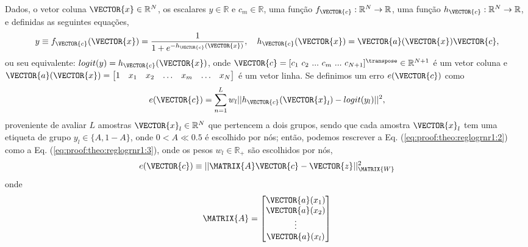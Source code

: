 
\begin{myproofT}\label{proof:theo:reglogrnr1}
Dados,
o vetor coluna $\VECTOR{x} \in \mathbb{R}^{N}$, os escalares $y \in \mathbb{R}$ e $c_m \in \mathbb{R}$,
uma função $f_{\VECTOR{c}}:\mathbb{R}^{N} \rightarrow \mathbb{R}$, 
uma função $h_{\VECTOR{c}}:\mathbb{R}^{N} \rightarrow \mathbb{R}$,  e 
definidas as seguintes equações,
\begin{equation}\label{eq:proof:theo:reglogrnr1:1}
y\equiv f_{\VECTOR{c}}(\VECTOR{x})= \frac{1}{1+e^{-h_{\VECTOR{c}}(\VECTOR{x}) }},
\quad h_{\VECTOR{c}}(\VECTOR{x}) =  \VECTOR{a}(\VECTOR{x})\VECTOR{c},
\end{equation}
ou seu equivalente: $logit(y)=h_{\VECTOR{c}}(\VECTOR{x})$,
onde $\VECTOR{c}=[c_1~ c_2~ ...~ c_m~ ...~ c_{N+1}]^{\transpose} \in \mathbb{R}^{N+1}$ é um vetor coluna e
$\VECTOR{a}(\VECTOR{x})=\begin{bmatrix} 
1& x_1& x_2& \hdots & x_m& \hdots& x_N
\end{bmatrix}$ é um vetor linha.
Se definimos um erro $e(\VECTOR{c})$ como
\begin{equation}\label{eq:proof:theo:reglogrnr1:2}
e(\VECTOR{c}) =  \sum_{n=1}^{L} w_l||h_{\VECTOR{c}}(\VECTOR{x}_l)-logit(y_l)||^2,
\end{equation}
proveniente de avaliar $L$ amostras $\VECTOR{x}_l \in \mathbb{R}^{N}$ que pertencem a dois grupos, 
sendo que cada amostra $\VECTOR{x}_l$ tem uma etiqueta de grupo $y_l\in \{A,1-A\}$, 
onde $0<A\ll 0.5$ é escolhido por nós;
então, podemos rescrever a Eq. (\ref{eq:proof:theo:reglogrnr1:2}) como a Eq. (\ref{eq:proof:theo:reglogrnr1:3}),
onde os pesos $w_l \in \mathbb{R}_+$ são escolhidos por nós,
\begin{equation}\label{eq:proof:theo:reglogrnr1:3}
e(\VECTOR{c}) \equiv ||\MATRIX{A}\VECTOR{c}-\VECTOR{z}||_{\MATRIX{W}}^2 
\end{equation}
onde 
\begin{equation}\label{eq:proof:reglogrnr1:4}
\MATRIX{A}=\begin{bmatrix}
\VECTOR{a}(x_1)\\
\VECTOR{a}(x_2)\\
\vdots\\
\VECTOR{a}(x_l)\\

\end{bmatrix}
\end{equation}
\end{myproofT}
